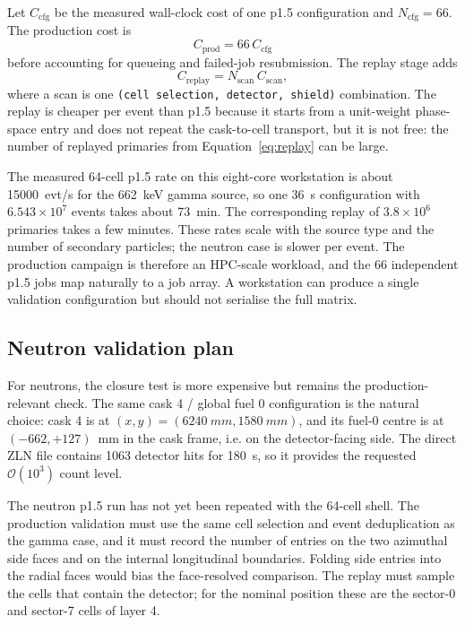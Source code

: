 \documentclass[11pt,a4paper]{article}
\begin{document}
Let $C_{\mathrm{cfg}}$ be the measured wall-clock cost of one p1.5
configuration and $N_{\mathrm{cfg}}=66$. The production cost is
\begin{equation}
  C_{\mathrm{prod}} = 66\,C_{\mathrm{cfg}}
\end{equation}
before accounting for queueing and failed-job resubmission. The replay stage
adds
\begin{equation}
  C_{\mathrm{replay}} = N_{\mathrm{scan}}\,C_{\mathrm{scan}},
\end{equation}
where a scan is one \texttt{(cell selection, detector, shield)} combination. The
replay is cheaper per event than p1.5 because it starts from a unit-weight
phase-space entry and does not repeat the cask-to-cell transport, but it is not
free: the number of replayed primaries from Equation~\eqref{eq:replay} can be
large.

The measured 64-cell p1.5 rate on this eight-core workstation is about
\SI{15000}{evt/s} for the \SI{662}{keV} gamma source, so one \SI{36}{s}
configuration with $6.543\times10^7$ events takes about \SI{73}{min}. The
corresponding replay of $3.8\times10^6$ primaries takes a few minutes. These
rates scale with the source type and the number of secondary particles; the
neutron case is slower per event. The production campaign is therefore an
HPC-scale workload, and the 66 independent p1.5 jobs map naturally to a job
array. A workstation can produce a single validation configuration but should
not serialise the full matrix.

\subsection{Neutron validation plan}

For neutrons, the closure test is more expensive but remains the
production-relevant check. The same cask 4 / global fuel 0 configuration is the
natural choice: cask 4 is at $(x,y)=(\SI{6240}{mm},\SI{1580}{mm})$, and its
fuel-0 centre is at $(-662,+127)$~mm in the cask frame, i.e. on the
detector-facing side. The direct ZLN file contains 1063 detector hits for
\SI{180}{s}, so it provides the requested $\mathcal{O}(10^3)$ count level.

The neutron p1.5 run has not yet been repeated with the 64-cell shell. The
production validation must use the same cell selection and event
deduplication as the gamma case, and it must record the number of entries on the
two azimuthal side faces and on the internal longitudinal boundaries. Folding
side entries into the radial faces would bias the face-resolved comparison. The
replay must sample the cells that contain the detector; for the nominal position
these are the sector-0 and sector-7 cells of layer 4.
\end{document}
